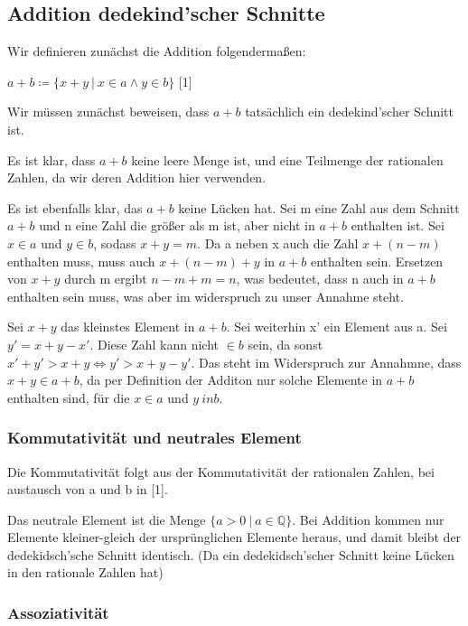 \documentclass[12pt]{article}
\begin{document}
    \subsection{Addition dedekind'scher Schnitte}

    Wir definieren zunächst die Addition folgendermaßen:

    $a + b \coloneqq \{x + y \mspace{4mu} | \mspace{4mu} x \in a \land y \in b\}$ [1]

    Wir müssen zunächst beweisen, dass $a + b$ tatsächlich ein dedekind'scher Schnitt ist.

    Es ist klar, dass $a + b$ keine leere Menge ist, und eine Teilmenge der rationalen Zahlen, da wir deren Addition
    hier verwenden.

    Es ist ebenfalls klar, das $a + b$ keine Lücken hat.
    Sei m eine Zahl aus dem Schnitt $a + b$ und n eine Zahl die größer als m ist, aber nicht in $a + b$ enthalten ist.
    Sei $x \in a$ und $y \in b$, sodass $x + y = m$. Da a neben x auch die Zahl $x + (n - m)$ enthalten muss,
    muss auch $x + (n - m) + y$ in $a + b$ enthalten sein. Ersetzen von $x + y$ durch m ergibt $n - m + m = n$,
    was bedeutet, dass n auch in $a + b$ enthalten sein muss, was aber im widerspruch zu unser Annahme steht.

    Sei $x + y$ das kleinstes Element in $a + b$. Sei weiterhin x' ein Element aus a.
    Sei $y' = x + y - x'$. Diese Zahl kann nicht $\in b$ sein, da sonst $x' + y' > x + y \Leftrightarrow y' > x + y - y'$.
    Das steht im Widerspruch zur Annahmne, dass $x + y \in a + b$, da per Definition der Additon nur solche Elemente
    in $a + b$ enthalten sind, für die $x \in a$ und $y \ in b$.

    \subsubsection{Kommutativität und neutrales Element}

    Die Kommutativität folgt aus der Kommutativität der rationalen Zahlen, bei austausch von a und b in [1].

    Das neutrale Element ist die Menge $\{a > 0 \mspace{4mu} | \mspace{4mu} a \in \mathbb{Q}\}$.
    Bei Addition kommen nur Elemente kleiner-gleich der ursprünglichen Elemente heraus, und damit bleibt
    der dedekidsch'sche Schnitt identisch.
    (Da ein dedekidsch'scher Schnitt keine Lücken in den rationale Zahlen hat)

    \subsubsection{Assoziativität}
\end{document}
